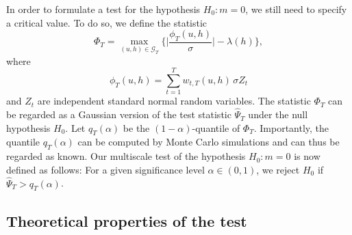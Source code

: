 In order to formulate a test for the hypothesis $H_0: m = 0$, we still need to specify a critical value. To do so, we define the statistic
\begin{equation}\label{Phi-statistic}
\Phi_T = \max_{(u,h) \in \mathcal{G}_T} \Big\{ \Big|\frac{\phi_T(u,h)}{\sigma}\Big| - \lambda(h) \Big\},
\end{equation} 
where
\[ \phi_T(u,h) = \sum\limits_{t=1}^T w_{t,T}(u,h) \, \sigma Z_t \]
and $Z_t$ are independent standard normal random variables. The statistic $\Phi_T$ can be regarded as a Gaussian version of the test statistic $\widehat{\Psi}_T$ under the null hypothesis $H_0$. Let $q_T(\alpha)$ be the $(1-\alpha)$-quantile of $\Phi_T$. Importantly, the quantile $q_T(\alpha)$ can be computed by Monte Carlo simulations and can thus be regarded as known. Our multiscale test of the hypothesis $H_0: m = 0$ is now defined as follows: For a given significance level $\alpha \in (0,1)$, we reject $H_0$ if $\widehat{\Psi}_T > q_T(\alpha)$. 


\subsection{Theoretical properties of the test}\label{subsec-method-theo}


